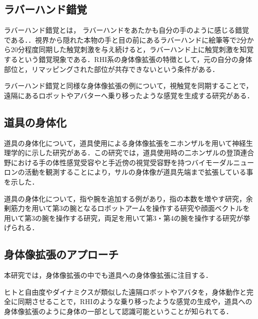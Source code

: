 \begin{small}
    \subsection{ラバーハンド錯覚} %
      ラバーハンド錯覚とは， ラバーハンドをあたかも自分の手のように感じる錯覚である．．視界から隠れた本物の手と目の前にあるラバーハンドに絵筆等で2分から20分程度同期した触覚刺激を与え続けると，ラバーハンド上に触覚刺激を知覚するという錯覚現象である．RHI系の身体像拡張の特徴として，元の自分の身体部位と，リマッピングされた部位が共存できないという条件がある．

      ラバーハンド錯覚と同様な身体像拡張の例について，視触覚を同期することで，遠隔にあるロボットやアバターへ乗り移ったような感覚を生成する研究がある\cite{tachi2015telexistence}\cite{ehrsson2004s}\cite{slater2008towards}\cite{iwasaki2017research}\cite{petkova2008if}．

    \subsection{道具の身体化} %
      道具の身体化について，道具使用による身体像拡張をニホンザルを用いて神経生理学的に示した研究がある\cite{iriki1996coding}．この研究では，道具使用時の二ホンザルの登頂連合野における手の体性感覚受容やと手近傍の視覚受容野を持つバイモーダルニューロンの活動を観測することにより，サルの身体像が道具先端まで拡張している事を示した．

      道具の身体化について，指や腕を追加する例があり，指の本数を増やす研究\cite{prattichizzo2014sixth}，余剰筋力を用いて第3の腕となるロボットアームを操作する研究\cite{iwadare2017thirdarm}\cite{岩垂真哉2016余剰筋力を用いた第三の腕ロボットの操縦}や顔面ベクトルを用いて第3の腕を操作する研究\cite{iwasaki2017research}，両足を用いて第3・第4の腕を操作する研究が挙げられる\cite{sasaki2017metalimbs}．


  \subsection{身体像拡張のアプローチ} 
    本研究では，身体像拡張の中でも道具への身体像拡張に注目する．

    ヒトと自由度やダイナミクスが類似した遠隔ロボットやアバタを，身体動作と完全に同期させることで，RHIのような乗り移ったような感覚の生成や，道具への身体像拡張のように身体の一部として認識可能ということが知られてる．


\end{small}
